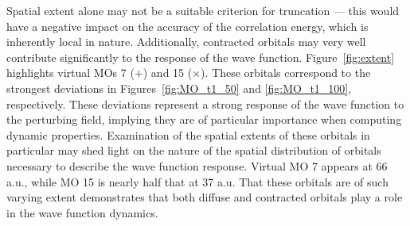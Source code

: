 Spatial extent alone may not be a suitable criterion for truncation --- 
this would have a negative impact on the accuracy of the 
correlation energy, which is inherently local in nature. 
Additionally, contracted orbitals may very well contribute 
significantly to the response of the wave function. 
Figure~\ref{fig:extent} highlights virtual MOs 7 
($\boldsymbol{+}$) and 15 ($\boldsymbol{\times}$).
These orbitals correspond to the strongest deviations in 
Figures~\ref{fig:MO_t1_50} and \ref{fig:MO_t1_100}, respectively.
These deviations represent a strong response of the wave function
to the perturbing field, implying they are of particular importance
when computing dynamic properties. 
Examination of the spatial extents of these orbitals in particular 
may shed light on the nature of the spatial distribution of 
orbitals necessary to describe the wave function response.
Virtual MO 7 appears at 66 a.u., while MO 15 is nearly half that at 37 a.u.
That these orbitals are of such varying extent
demonstrates that both diffuse and contracted orbitals play a role in 
the wave function dynamics.


